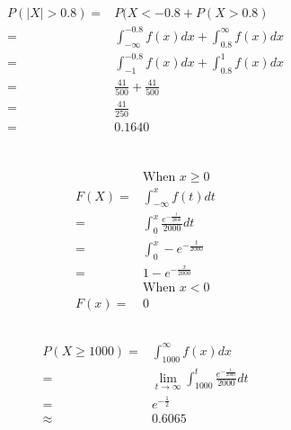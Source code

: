 \documentclass{article}
\begin{document}
        \subsection{}
            \begin{equation*}
                \begin{split}
                    P(|X|>0.8)=&P(X<-0.8+P(X>0.8)\\
                        =&\int_{-\infty}^{-0.8}f(x)dx+\int_{0.8}^\infty f(x)dx\\
                        =&\int_{-1}^{-0.8}f(x)dx+\int_{0.8}^1 f(x)dx\\
                        =&\frac{41}{500}+\frac{41}{500}\\
                        =&\frac{41}{250}\\
                        =&0.1640
                \end{split}
            \end{equation*}
    \section{}
        \subsection{}
        
            \begin{equation*}
                \begin{split}
                    &\text{When $x\geq 0$}\\
                    F(X)=&\int_{-\infty}^{x}f(t)dt\\
                        =&\int_0^x\frac{e^{-\frac{t}{2000}}}{2000}dt\\
                        =&\int_0^x-e^{-\frac{t}{2000}}\\
                        =&1-e^{-\frac{x}{2000}}\\
                     &\text{When $x< 0$}\\
                    F(x)=&0
                \end{split}
            \end{equation*}
        \subsection{}
            \begin{equation*}
                \begin{split}
                    P(X\geq 1000)=&\int_{1000}^\infty f(x)dx\\
                        =&\lim_{t\rightarrow \infty} \int_{1000}^t \frac{e^{-\frac{t}{2000}}}{2000}dt\\
                        =&e^{-\frac{1}{2}}\\
                        \approx&0.6065\\
                \end{split}
            \end{equation*}
\end{document}
